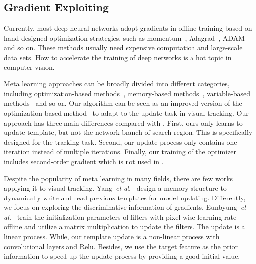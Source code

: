 \documentclass[10pt,twocolumn,letterpaper]{article}
\begin{document}
\subsection{Gradient Exploiting}
Currently, most deep neural networks adopt gradients in offline training based on hand-designed optimization strategies, such as momentum~\cite{momentum}, Adagrad~\cite{adagrad}, ADAM~\cite{adam} and so on.
These methods usually need expensive computation and large-scale data sets.
How to accelerate the training of deep networks is a hot topic in computer vision.

\vspace{-4pt}
{}
Meta learning approaches can be broadly divided into different categories, including
optimization-based methods~\cite{ltl-nip16}, memory-based methods~\cite{mann-icml16}, variable-based methods~\cite{mamm-icml17, Andrei-corr18-latent, Li-corr17-metasgd} and so on.
Our algorithm can be seen as an improved version of the optimization-based method~\cite{ltl-nip16} to adapt to the update task in visual tracking. Our approach has three main differences compared with \cite{ltl-nip16}. First, ours only learns to update template, but not the network branch of search region. This is specifically designed for the tracking task. Second, our update process only contains one iteration instead of multiple iterations. Finally, our training of the optimizer includes second-order gradient which is not used in \cite{ltl-nip16}.

\vspace{-4pt}
{}
Despite the popularity of meta learning in many fields, there are few works~\cite{Yang-memtracker-eccv2018,Eunbyung-eccv18-meta-tracker} applying it to visual tracking.
Yang~\emph{et al.}~\cite{Yang-memtracker-eccv2018} design a memory structure to
dynamically write and read previous templates for model updating. Differently, we focus on exploring the discriminative information of gradients.
Eunbyung~\emph{et al.}~\cite{Eunbyung-eccv18-meta-tracker} train the initialization parameters of filters with pixel-wise learning rate offline and utilize a matrix multiplication to update the filters. The update is a linear process. While, our template update is a non-linear process with convolutional layers and Relu. Besides, we use the target feature as the prior information to speed up the update process by providing a good initial value.
\end{document}
